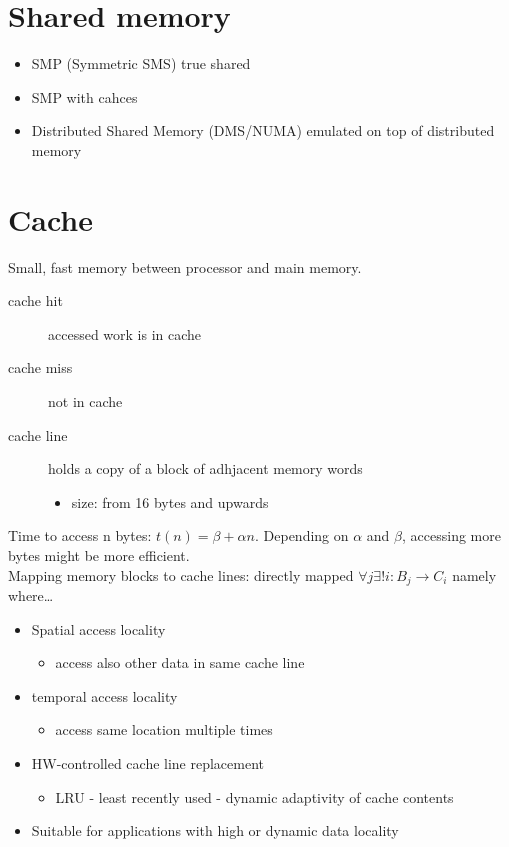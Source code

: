 \documentclass[a4paper]{article}
\begin{document}
 \section{Shared memory}
 \begin{itemize}
     \item SMP (Symmetric SMS) true shared
     \item SMP with cahces
     \item Distributed Shared Memory (DMS/NUMA) emulated on top of distributed memory
 \end{itemize}
 \section{Cache}
 Small, fast memory between processor and main memory.
 \begin{description}
     \item[cache hit] accessed work is in cache
     \item[cache miss] not in cache
     \item[cache line] holds a copy of a block of adhjacent memory words
         \begin{itemize}
             \item size: from 16 bytes and upwards
         \end{itemize}
 \end{description}
Time to access n bytes: $t(n)=\beta+\alpha n$. Depending on $\alpha$ and $\beta$,
accessing more bytes might be more efficient.
\\Mapping memory blocks to cache lines:
directly mapped $\forall j\exists!i: B_j\rightarrow C_i$ namely where\ldots
\begin{itemize}
    \item Spatial access locality
        \begin{itemize}
            \item access also other data in same cache line
        \end{itemize}
        \item temporal access locality
            \begin{itemize}
                \item access same location multiple times
            \end{itemize}
        \item HW-controlled cache line replacement
            \begin{itemize}
                \item LRU - least recently used - dynamic adaptivity of cache contents
            \end{itemize}
        \item Suitable for applications with high or dynamic data locality
\end{itemize}
\end{document}

